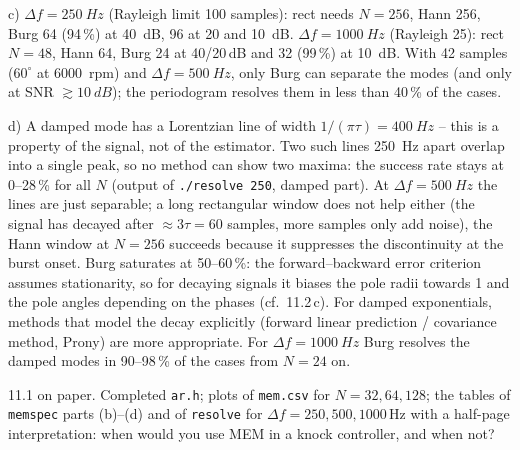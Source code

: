 \begin{solution}
c) $\Delta f=\SI{250}{Hz}$ (Rayleigh limit 100 samples): rect needs $N=256$, Hann 256,
Burg 64 (94\,\%) at \SI{40}{dB}, 96 at 20 and \SI{10}{dB}.
$\Delta f=\SI{1000}{Hz}$ (Rayleigh 25): rect $N=48$, Hann 64, Burg 24 at 40/20\,dB and 32
(99\,\%) at \SI{10}{dB}. With 42 samples ($60^\circ$ at \SI{6000}{rpm}) and
$\Delta f=\SI{500}{Hz}$, only Burg can separate the modes (and only at SNR
$\gtrsim\SI{10}{dB}$); the periodogram resolves them in less than 40\,\% of the cases.

d) A damped mode has a Lorentzian line of width $1/(\pi\tau)=\SI{400}{Hz}$ -- this is a
property of the signal, not of the estimator. Two such lines \SI{250}{Hz} apart overlap
into a single peak, so no method can show two maxima: the success rate stays at
0--28\,\% for all $N$ (output of \texttt{./resolve 250}, damped part). At
$\Delta f=\SI{500}{Hz}$ the lines are just separable; a long rectangular window does
not help either (the signal has decayed after $\approx3\tau=60$ samples, more samples
only add noise), the Hann window at $N=256$ succeeds because it suppresses the
discontinuity at the burst onset. Burg saturates at 50--60\,\%: the forward--backward
error criterion assumes stationarity, so for decaying signals it biases the pole radii
towards 1 and the pole angles depending on the phases (cf.\ 11.2\,c). For damped
exponentials, methods that model the decay explicitly (forward linear prediction /
covariance method, Prony) are more appropriate. For $\Delta f=\SI{1000}{Hz}$ Burg
resolves the damped modes in 90--98\,\% of the cases from $N=24$ on.
\end{solution}

\begin{deliverables}
11.1 on paper. Completed \texttt{ar.h}; plots of \texttt{mem.csv} for $N=32,64,128$;
the tables of \texttt{memspec} parts (b)--(d) and of \texttt{resolve} for
$\Delta f=250,500,1000$\,Hz with a half-page interpretation: when would you use MEM
in a knock controller, and when not?
\end{deliverables}
